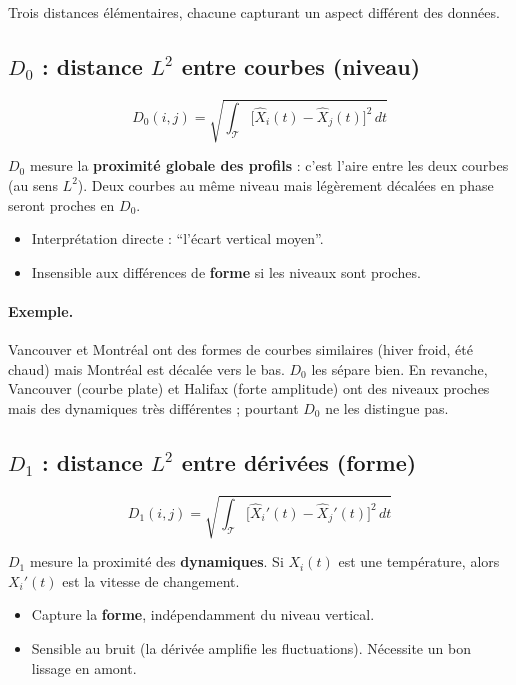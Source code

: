 \documentclass[11pt, a4paper]{article}
\begin{document}
Trois distances élémentaires, chacune capturant un aspect différent des données.

\subsection{$D_0$ : distance $L^2$ entre courbes (\textbf{niveau})}

\[
  D_0(i,j) = \sqrt{\int_{\mathcal{T}} \bigl[\hat{X}_i(t) - \hat{X}_j(t)\bigr]^2 \, dt}
\]

$D_0$ mesure la \textbf{proximité globale des profils} : c'est l'aire entre
les deux courbes (au sens $L^2$). Deux courbes au même niveau mais
légèrement décalées en phase seront proches en $D_0$.

\begin{itemize}[nosep]
  \item[\textcolor{mix}{$\boldsymbol{+}$}] Interprétation directe : ``l'écart vertical moyen''.
  \item[\textcolor{vect}{$\boldsymbol{-}$}] Insensible aux différences de
    \textbf{forme} si les niveaux sont proches.
\end{itemize}

\paragraph{Exemple.}
Vancouver et Montréal ont des formes de courbes similaires (hiver froid, été
chaud) mais Montréal est décalée vers le bas. $D_0$ les sépare bien. En
revanche, Vancouver (courbe plate) et Halifax (forte amplitude) ont des
niveaux proches mais des dynamiques très différentes ; pourtant $D_0$ ne les distingue pas.

\subsection{$D_1$ : distance $L^2$ entre dérivées (\textbf{forme})}

\[
  D_1(i,j) = \sqrt{\int_{\mathcal{T}} \bigl[\hat{X}_i'(t) - \hat{X}_j'(t)\bigr]^2 \, dt}
\]

$D_1$ mesure la proximité des \textbf{dynamiques}. Si $X_i(t)$ est une
température, alors $X_i'(t)$ est la vitesse de changement.

\begin{itemize}[nosep]
  \item[\textcolor{mix}{$\boldsymbol{+}$}] Capture la \textbf{forme},
    indépendamment du niveau vertical.
  \item[\textcolor{vect}{$\boldsymbol{-}$}] Sensible au bruit (la dérivée
    amplifie les fluctuations). Nécessite un bon lissage en amont.
\end{itemize}
\end{document}
